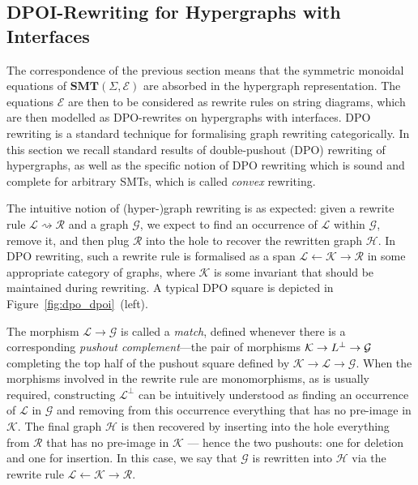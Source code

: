 \subsection{DPOI-Rewriting for Hypergraphs with Interfaces}
The correspondence of the previous section means that the symmetric monoidal equations of $\textbf{SMT}(\Sigma, \mathcal{E})$ are absorbed in the hypergraph representation.  The equations $\mathcal{E}$ are then to be considered as rewrite rules on string diagrams,  which are then modelled as DPO-rewrites on hypergraphs with interfaces. 
DPO rewriting is a standard technique for formalising graph rewriting categorically. 
In this section we recall standard results of double-pushout (DPO) rewriting of hypergraphs,  as well as the specific notion of DPO rewriting which is sound and complete for arbitrary SMTs,  which is called \textit{convex} rewriting. 

The intuitive notion of (hyper-)graph rewriting is  as expected: given a rewrite rule $\mathcal L \rightsquigarrow \mathcal R$ and a graph $\mathcal{G}$,  we expect to find an occurrence of $\mathcal L$ within $\mathcal{G}$,  remove it,  and then plug $\mathcal R$ into the hole to recover the rewritten graph $\mathcal{H}$.  In DPO rewriting,  such a rewrite rule is formalised as a span $\mathcal L \xleftarrow{} \mathcal K \xrightarrow{} \mathcal R$ in some appropriate category of graphs,  where $\mathcal K$ is some invariant that should be maintained during rewriting.
A typical DPO square is depicted in Figure~\ref{fig:dpo_dpoi}~(left).


The morphism $\mathcal L \to \mathcal G$ is called a \textit{match},  defined whenever there is a corresponding \textit{pushout complement}---the pair of morphisms $\mathcal K \to \mathcal \mathcal{L}^{\bot} \to \mathcal G$ completing the top half of the pushout square defined by $\mathcal K \xrightarrow{} \mathcal L \xrightarrow{} \mathcal G$. 
When the morphisms involved in the rewrite rule are monomorphisms,  as is usually required,  constructing $\mathcal{L}^{\bot}$ can be intuitively understood as finding an occurrence of $\mathcal L$ in $\mathcal G$ and removing from this occurrence everything that has no pre-image in $\mathcal K$.  The final graph $\mathcal H$ is then recovered by inserting into the hole everything from $\mathcal R$ that has no pre-image in $\mathcal K$ --- hence the two pushouts: one for deletion and one for insertion.  In this case,  we say that $\mathcal G$ is rewritten into $\mathcal H$ via the rewrite rule $\mathcal L \xleftarrow{} \mathcal K \xrightarrow{} \mathcal R$.


